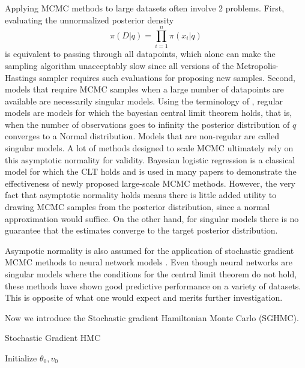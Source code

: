 \documentclass[12pt]{report}
\begin{document}
Applying MCMC methods to large datasets often involve 2 problems. First, evaluating the unnormalized posterior density
\[ \pi(D|q) = \prod_{i=1}^n \pi(x_i|q) \]
 is equivalent to passing through all datapoints, which alone can make the sampling algorithm unacceptably slow since all versions of the Metropolis-Hastings sampler requires such evaluations for proposing new samples. Second, models that require MCMC samples when a large number of datapoints are available are necessarily singular models. Using the terminology of \cite{watanabe2009algebraic}, regular models are models for which the bayesian central limit theorem \cite{le2012asymptotic} holds, that is, when the number of observations goes to infinity the posterior distribution of $q$ converges to a Normal distribution. Models that are non-regular are called singular models. A lot of methods designed to scale MCMC \cite{neiswanger2013asymptotically,scott2016bayes} ultimately rely on this asymptotic normality for validity. Bayesian logistic regression is a classical model for which the CLT holds and is used in many papers to demonstrate the effectiveness of newly proposed large-scale MCMC methods. However, the very fact that asymptotic normality holds means there is little added utility to drawing MCMC samples from the posterior distribution, since a normal approximation would suffice. On the other hand, for singular models there is no guarantee that the estimates converge to the target posterior distribution. 

Asympotic normality is also assumed for the application of stochastic gradient MCMC methods to neural network models \cite{welling2011bayesian,chen2014stochastic,ahn2012bayesian,ding2014bayesian,ma2015complete}. Even though neural networks are singular models where the conditions for the central limit theorem do not hold, these methods have shown good predictive performance on a variety of datasets. This is opposite of what one would expect and merits further investigation.


Now we introduce the Stochastic gradient Hamiltonian Monte Carlo (SGHMC). \cite{chen2014stochastic}


\begin{algorithm}
    \caption{Stochastic Gradient HMC}
        Initialize $\theta_0,v_0$ \;
\end{algorithm}
\end{document}
